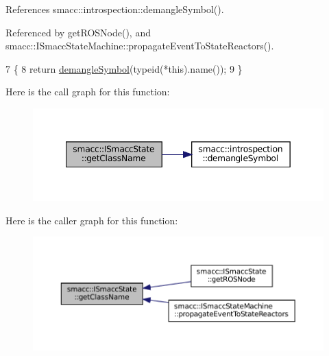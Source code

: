 References smacc\+::introspection\+::demangle\+Symbol().



Referenced by get\+R\+O\+S\+Node(), and smacc\+::\+I\+Smacc\+State\+Machine\+::propagate\+Event\+To\+State\+Reactors().


\begin{DoxyCode}
7 \{
8     \textcolor{keywordflow}{return} \hyperlink{namespacesmacc_1_1introspection_a2f495108db3e57604d8d3ff5ef030302}{demangleSymbol}(\textcolor{keyword}{typeid}(*this).name());
9 \}
\end{DoxyCode}
Here is the call graph for this function\+:
\nopagebreak
\begin{figure}[H]
\begin{center}
\leavevmode
\includegraphics[width=349pt]{classsmacc_1_1ISmaccState_a5bf0b49d5ea6b9e8f45c26fa155b2664_cgraph}
\end{center}
\end{figure}
Here is the caller graph for this function\+:
\nopagebreak
\begin{figure}[H]
\begin{center}
\leavevmode
\includegraphics[width=350pt]{classsmacc_1_1ISmaccState_a5bf0b49d5ea6b9e8f45c26fa155b2664_icgraph}
\end{center}
\end{figure}
\mbox{\label{classsmacc_1_1ISmaccState_ad6811b03329d9e694e78bc4b1220c2c0}} 
